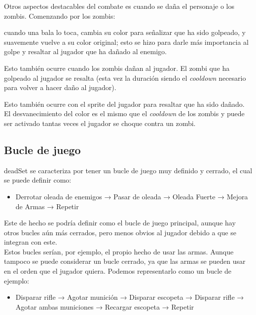 \documentclass[12pt]{article}
\begin{document}
    Otros aspectos destacables del combate es cuando se daña el personaje o los zombis. Comenzando por los zombis: 
    
    cuando una bala lo toca, cambia su color para señalizar que ha sido golpeado, y suavemente vuelve a su color original; esto se hizo para darle más importancia al golpe y resaltar al jugador que ha dañado al enemigo. 

    Esto también ocurre cuando los zombis dañan al jugador. El zombi que ha golpeado al jugador se resalta (esta vez la duración siendo el \textit{cooldown} necesario para volver a hacer daño al jugador). 
    
    Esto también ocurre con el sprite del jugador para resaltar que ha sido dañado. El desvanecimiento del color es el mismo que el \textit{cooldown} de los zombis y puede ser activado tantas veces el jugador se choque contra un zombi.

        \subsection{Bucle de juego}
        \textunderscore deadSet se caracteriza por tener un bucle de juego muy definido y cerrado, el cual se puede definir como:
        
        \begin{itemize}
            \item Derrotar oleada de enemigos → Pasar de oleada → Oleada Fuerte → Mejora de Armas → Repetir
        \end{itemize}
        Este de hecho se podría definir como el bucle de juego principal, aunque hay otros bucles aún más cerrados, pero menos obvios al jugador debido a que se integran con este.\\
        
        Estos bucles serían, por ejemplo, el propio hecho de usar las armas. Aunque tampoco se puede considerar un bucle cerrado, ya que las armas se pueden usar en el orden que el jugador quiera. Podemos representarlo como un bucle de ejemplo:\\
        \begin{itemize}
            \item Disparar rifle → Agotar munición → Disparar escopeta → Disparar rifle → Agotar ambas municiones → Recargar escopeta → Repetir
        \end{itemize}
\newpage
\end{document}
